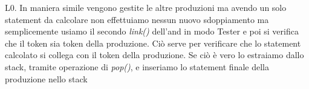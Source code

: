 L0. In maniera simile vengono gestite le altre produzioni ma avendo un solo statement da calcolare non effettuiamo nessun nuovo sdoppiamento ma semplicemente usiamo il secondo \textit{link()} dell'and in modo Tester e poi si verifica che il token sia token della produzione. Ciò serve per verificare che lo statement calcolato si collega con il token della produzione. Se ciò è vero lo estraiamo dallo stack, tramite operazione di \textit{pop()}, e inseriamo lo statement finale della produzione nello stack